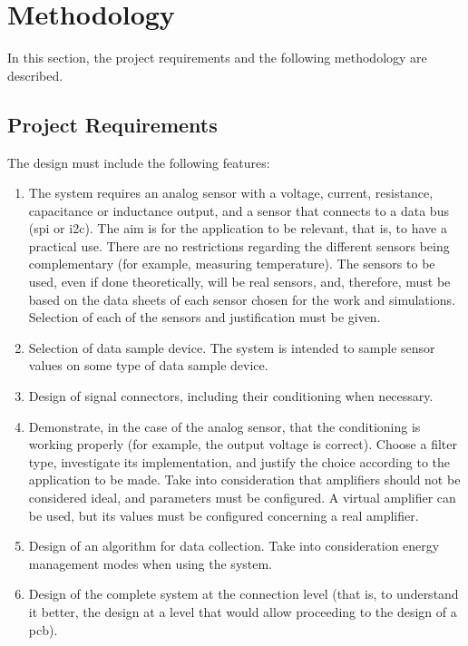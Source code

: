 \section{Methodology}
\label{sec:methodology}
\hspace{12pt}
In this section, the project requirements and the following methodology are described.

\subsection{Project Requirements}
\label{sec:methodology:project_reqs}
\hspace{8pt}

The design must include the following features:

\begin{enumerate}
    \item The system requires an analog sensor with a voltage, current, resistance, capacitance or inductance output, and a sensor that connects to a data bus (\acrfull{spi} or \acrfull{i2c}). The aim is for the application to be relevant, that is, to have a practical use. There are no restrictions regarding the different sensors being complementary (for example, measuring temperature). The sensors to be used, even if done theoretically, will be real sensors, and, therefore, must be based on the data sheets of each sensor chosen for the work and simulations. Selection of each of the sensors and justification must be given.

    \item Selection of data sample device. The system is intended to sample sensor values on some type of data sample device.

    \item Design of signal connectors, including their conditioning when necessary.

    \item Demonstrate, in the case of the analog sensor, that the conditioning is working properly (for example, the output voltage is correct). Choose a filter type, investigate its implementation, and justify the choice according to the application to be made. Take into consideration that amplifiers should not be considered ideal, and parameters must be configured. A virtual amplifier can be used, but its values must be configured concerning a real amplifier.

    \item Design of an algorithm for data collection. Take into consideration energy management modes when using the system.

    \item Design of the complete system at the connection level (that is, to understand it better, the design at a level that would allow proceeding to the design of a \acrfull{pcb}).
\end{enumerate}


